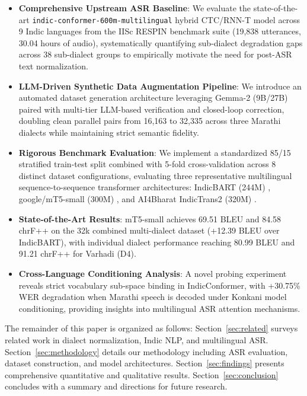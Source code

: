 \begin{itemize}
    \item \textbf{Comprehensive Upstream ASR Baseline}: We evaluate the state-of-the-art \texttt{indic-conformer-600m-multilingual} hybrid CTC/RNN-T model \cite{jain2024indicconformer} across 9 Indic languages from the IISc RESPIN benchmark suite \cite{singh2024respin} (19,838 utterances, 30.04 hours of audio), systematically quantifying sub-dialect degradation gaps across 38 sub-dialect groups to empirically motivate the need for post-ASR text normalization.
    \item \textbf{LLM-Driven Synthetic Data Augmentation Pipeline}: We introduce an automated dataset generation architecture leveraging Gemma-2 (9B/27B) \cite{gemma2024} paired with multi-tier LLM-based verification and closed-loop correction, doubling clean parallel pairs from 16,163 to 32,335 across three Marathi dialects while maintaining strict semantic fidelity.
    \item \textbf{Rigorous Benchmark Evaluation}: We implement a standardized 85/15 stratified train-test split combined with 5-fold cross-validation across 8 distinct dataset configurations, evaluating three representative multilingual sequence-to-sequence transformer architectures: IndicBART (244M) \cite{dabre2022indicbart}, google/mT5-small (300M) \cite{xue2021mt5}, and AI4Bharat IndicTrans2 (320M) \cite{gala2023indictrans2}.
    \item \textbf{State-of-the-Art Results}: mT5-small achieves 69.51 BLEU \cite{post2018sacrebleu} and 84.58 chrF++ on the 32k combined multi-dialect dataset (+12.39 BLEU over IndicBART), with individual dialect performance reaching 80.99 BLEU and 91.21 chrF++ for Varhadi (D4).
    \item \textbf{Cross-Language Conditioning Analysis}: A novel probing experiment reveals strict vocabulary sub-space binding in IndicConformer, with +30.75\% WER degradation when Marathi speech is decoded under Konkani model conditioning, providing insights into multilingual ASR attention mechanisms.
\end{itemize}

The remainder of this paper is organized as follows: Section~\ref{sec:related} surveys related work in dialect normalization, Indic NLP, and multilingual ASR. Section~\ref{sec:methodology} details our methodology including ASR evaluation, dataset construction, and model architectures. Section~\ref{sec:findings} presents comprehensive quantitative and qualitative results. Section~\ref{sec:conclusion} concludes with a summary and directions for future research.

